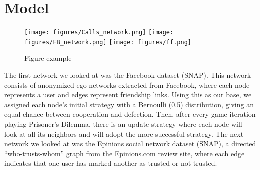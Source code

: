 \section{Model}
\begin{figure*}[ht]
    \centering
    \texttt{[image: figures/Calls\_network.png]}
    \texttt{[image: figures/FB\_network.png]}
    \texttt{[image: figures/ff.png]}
    \caption{Figure example}
    \label{fig:enter-label}
\end{figure*}


The first network we looked at was the Facebook dataset (SNAP). This network consists of anonymized ego-networks extracted from Facebook, where each node represents a user and edges represent friendship links. Using this as our base, we assigned each node’s initial strategy with a Bernoulli (0.5) distribution, giving an equal chance between cooperation and defection. Then, after every game iteration playing Prisoner’s Dilemma, there is an update strategy where each node will look at all its neighbors and will adopt the more successful strategy. 
The next network we looked at was the Epinions social network dataset (SNAP), a directed “who-trusts-whom” graph from the Epinions.com review site, where each edge indicates that one user has marked another as trusted or not trusted. 
